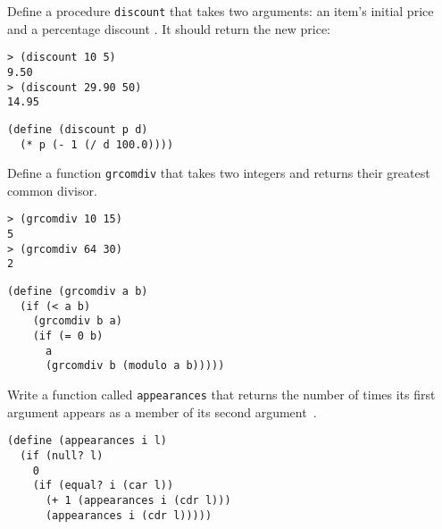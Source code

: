 \documentclass[addpoints,12pt,a4paper]{exam}
\begin{document}
\begin{questions}
\begin{solution}
\end{solution}


\question
Define a procedure \texttt{discount} that takes two arguments: an item’s initial price and a percentage discount \cite{simplyscheme}.
It should return the new price:
\begin{verbatim}
> (discount 10 5)
9.50
> (discount 29.90 50)
14.95
\end{verbatim}


\begin{solution}
  \begin{verbatim}
(define (discount p d)
  (* p (- 1 (/ d 100.0))))
  \end{verbatim}
\end{solution}


\question
Define a function \texttt{grcomdiv} that takes two integers and returns their greatest common divisor.
\begin{verbatim}
> (grcomdiv 10 15)
5
> (grcomdiv 64 30)
2
\end{verbatim}


\begin{solution}
  \begin{verbatim}
(define (grcomdiv a b)
  (if (< a b)
    (grcomdiv b a)
    (if (= 0 b)
      a
      (grcomdiv b (modulo a b)))))
  \end{verbatim}
\end{solution}

\question
Write a function called \texttt{appearances} that returns the number of times its first argument appears as a member of its second argument~\cite{simplyscheme}.

\begin{solution}
  \begin{verbatim}
(define (appearances i l)
  (if (null? l)
    0
    (if (equal? i (car l))  
      (+ 1 (appearances i (cdr l)))
      (appearances i (cdr l)))))   
  \end{verbatim}
\end{solution}


\end{questions}
\end{document}
